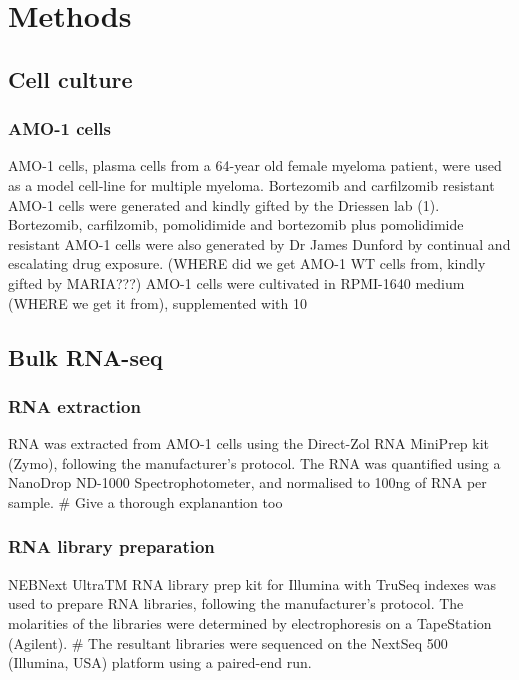 \chapter{\label{ch:3-methods}Methods}


\section{Cell culture}
\subsection{AMO-1 cells}
AMO-1 cells, plasma cells from a 64-year old female myeloma patient, were used as a model cell-line for multiple myeloma. Bortezomib and carfilzomib resistant AMO-1 cells were generated and kindly gifted by the Driessen lab (1). Bortezomib, carfilzomib, pomolidimide and bortezomib plus pomolidimide resistant AMO-1 cells were also generated by Dr James Dunford by continual and escalating drug exposure. (WHERE did we get AMO-1 WT cells from, kindly gifted by MARIA???)
AMO-1 cells were cultivated in RPMI-1640 medium (WHERE we get it from), supplemented with 10%


\section{Bulk RNA-seq}
\subsection{RNA extraction}
RNA was extracted from AMO-1 cells using the Direct-Zol RNA MiniPrep kit (Zymo), following the manufacturer's protocol.  The RNA was quantified using a NanoDrop ND-1000 Spectrophotometer, and normalised to 100ng of RNA per sample.
# Give a thorough explanantion too

\subsection{RNA library preparation}
NEBNext\textsuperscript{\textregistered} UltraTM RNA library prep kit for Illumina\textsuperscript{\textregistered} with TruSeq indexes was used to prepare RNA libraries, following the manufacturer's protocol. The molarities of the libraries were determined by electrophoresis on a TapeStation (Agilent).
#  The resultant libraries were sequenced on the NextSeq 500 (Illumina, USA) platform using a paired-end run.

